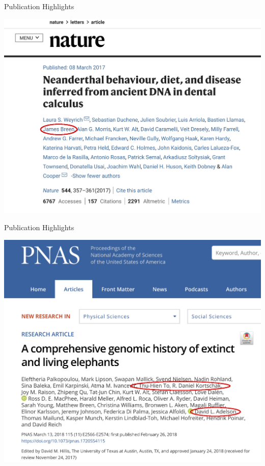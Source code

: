\documentclass[11pt]{beamer}
\begin{document}
\begin{frame}{Publication Highlights}

\center
\includegraphics[width=0.7\linewidth]{figures/Nature.jpg} \\[1cm]

\end{frame}

\begin{frame}{Publication Highlights}

\center
\includegraphics[width=0.7\linewidth]{figures/PNAS.jpg} \\[1cm]

\end{frame}
\end{document}
